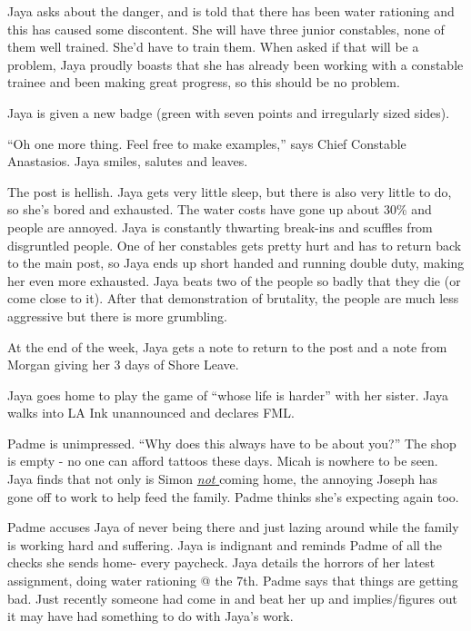 Jaya asks about the danger, and is told that there has been water rationing and this has caused some discontent.  She will have three junior constables, none of them well trained.  She'd have to train them.  When asked if that will be a problem, Jaya proudly boasts that she has already been working with a constable trainee and been making great progress, so this should be no problem.



Jaya is given a new badge (green with seven points and irregularly sized sides).



``Oh one more thing.  Feel free to make examples,''  says Chief Constable Anastasios.  Jaya smiles, salutes and leaves.



The post is hellish.  Jaya gets very little sleep, but there is also very little to do, so she's bored and exhausted.  The water costs have gone up about 30\% and people are annoyed.  Jaya is constantly thwarting break-ins and scuffles from disgruntled people.  One of her constables gets pretty hurt and has to return back to the main post, so Jaya ends up short handed and running double duty, making her even more exhausted.  Jaya beats two of the people so badly that they die (or come close to it).  After that demonstration of brutality, the people are much less aggressive but there is more grumbling.



At the end of the week, Jaya gets a note to return to the post and a note from Morgan giving her 3 days of Shore Leave.




Jaya goes home to play the game of ``whose life is harder'' with her sister.  Jaya walks into LA Ink unannounced and declares FML.



Padme is unimpressed.  ``Why does this always have to be about you?''  The shop is empty - no one can afford tattoos these days.  Micah is nowhere to be seen.  Jaya finds that not only is Simon \underline{ \textit{not } }coming home, the annoying Joseph has gone off to work to help feed the family.  Padme thinks she's expecting again too.



Padme accuses Jaya of never being there and just lazing around while the family is working hard and suffering.  Jaya is indignant and reminds Padme of all the checks she sends home- every paycheck.  Jaya details the horrors of her latest assignment, doing water rationing @ the 7th. Padme says that things are getting bad.  Just recently someone had come in and beat her up and implies/figures out it may have had something to do with Jaya's work. 



